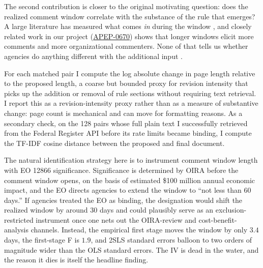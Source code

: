 \documentclass[12pt]{article}
\begin{document}
The second contribution is closer to the original motivating question: does the realized comment window correlate with the substance of the rule that emerges? A large literature has measured what comes \emph{in} during the window \citep{yackee2006sweet,yackee2012rule,yackee2015role,wagner2011rulemaking,golden1998interest}, and closely related work in our project (\href{https://github.com/SocialCatalystLab/ape-papers/tree/main/apep_0670}{APEP-0670}) shows that longer windows elicit more comments and more organizational commenters. None of that tells us whether agencies do anything different with the additional input \citep{mccubbins1987administrative,schuck1979litigation,kerwin2018rulemaking}.

For each matched pair I compute the log absolute change in page length relative to the proposed length, a coarse but bounded proxy for revision intensity that picks up the addition or removal of rule sections without requiring text retrieval. I report this as a revision-intensity proxy rather than as a measure of substantive change: page count is mechanical and can move for formatting reasons. As a secondary check, on the 128 pairs whose full plain text I successfully retrieved from the Federal Register API before its rate limits became binding, I compute the TF-IDF cosine distance between the proposed and final document.

The natural identification strategy here is to instrument comment window length with EO 12866 significance. Significance is determined by OIRA before the comment window opens, on the basis of estimated \$100 million annual economic impact, and the EO directs agencies to extend the window to ``not less than 60 days.'' If agencies treated the EO as binding, the designation would shift the realized window by around 30 days and could plausibly serve as an exclusion-restricted instrument once one nets out the OIRA-review and cost-benefit-analysis channels. Instead, the empirical first stage moves the window by only $3.4$ days, the first-stage F is $1.9$, and 2SLS standard errors balloon to two orders of magnitude wider than the OLS standard errors. The IV is dead in the water, and the reason it dies is itself the headline finding.
\end{document}

